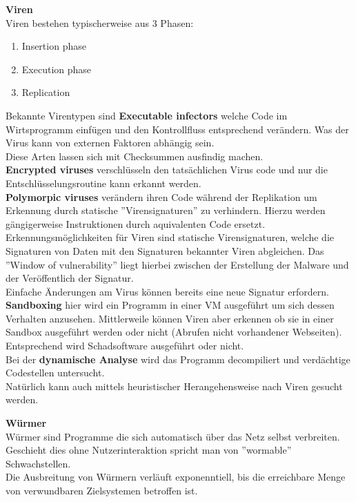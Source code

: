 \documentclass[a4paper,12pt,leqno]{article}
\begin{document}
\textbf{Viren}\\
Viren bestehen typischerweise aus 3 Phasen:
\begin{enumerate}
\item Insertion phase
\item Execution phase
\item Replication
\end{enumerate}

Bekannte Virentypen sind \textbf{Executable infectors} welche Code im Wirtsprogramm einfügen und den Kontrollfluss entsprechend verändern. Was der Virus kann von externen Faktoren abhängig sein.\\
Diese Arten lassen sich mit Checksummen ausfindig machen.\\

\textbf{Encrypted viruses} verschlüsseln den tatsächlichen Virus code und nur die Entschlüsselungsroutine kann erkannt werden.\\

\textbf{Polymorpic viruses} verändern ihren Code während der Replikation um Erkennung durch statische ''Virensignaturen'' zu verhindern. Hierzu werden gängigerweise Instruktionen durch aquivalenten Code ersetzt.\\

Erkennungsmöglichkeiten für Viren sind statische Virensignaturen, welche die Signaturen von Daten mit den Signaturen bekannter Viren abgleichen. Das ''Window of vulnerability'' liegt hierbei zwischen der Erstellung der Malware und der Veröffentlich der Signatur.\\
Einfache Änderungen am Virus können bereits eine neue Signatur erfordern.\\

\textbf{Sandboxing} hier wird ein Programm in einer VM ausgeführt um sich dessen Verhalten anzusehen. Mittlerweile können Viren aber erkennen ob sie in einer Sandbox ausgeführt werden oder nicht (Abrufen nicht vorhandener Webseiten). Entsprechend wird Schadsoftware ausgeführt oder nicht.\\
Bei der \textbf{dynamische Analyse} wird das Programm decompiliert und verdächtige Codestellen untersucht.\\
Natürlich kann auch mittels heuristischer Herangehensweise nach Viren gesucht werden.

\textbf{Würmer}\\
Würmer sind Programme die sich automatisch über das Netz selbst verbreiten. Geschieht dies ohne Nutzerinteraktion spricht man von ''wormable'' Schwachstellen.\\
Die Ausbreitung von Würmern verläuft exponenntiell, bis die erreichbare Menge von verwundbaren Zielsystemen betroffen ist.\\
\end{document}
